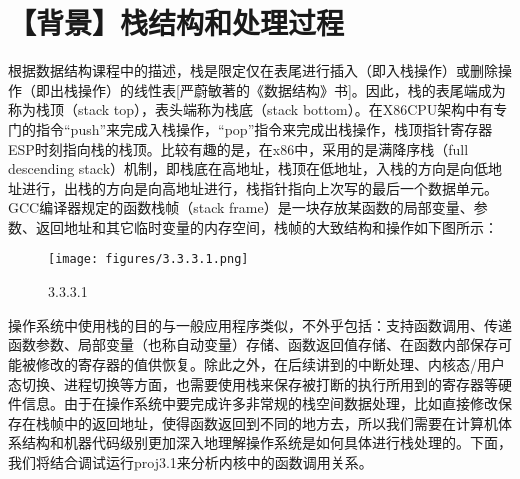 \section{【背景】栈结构和处理过程}\label{ux80ccux666fux6808ux7ed3ux6784ux548cux5904ux7406ux8fc7ux7a0b}

根据数据结构课程中的描述，栈是限定仅在表尾进行插入（即入栈操作）或删除操作（即出栈操作）的线性表{[}严蔚敏著的《数据结构》书{]}。因此，栈的表尾端成为称为栈顶（stack
top），表头端称为栈底（stack
bottom）。在X86CPU架构中有专门的指令``push''来完成入栈操作，``pop''指令来完成出栈操作，栈顶指针寄存器ESP时刻指向栈的栈顶。比较有趣的是，在x86中，采用的是满降序栈（full
descending
stack）机制，即栈底在高地址，栈顶在低地址，入栈的方向是向低地址进行，出栈的方向是向高地址进行，栈指针指向上次写的最后一个数据单元。GCC编译器规定的函数栈帧（stack
frame）是一块存放某函数的局部变量、参数、返回地址和其它临时变量的内存空间，栈帧的大致结构和操作如下图所示：

\begin{figure}[htbp]
\centering
\texttt{[image: figures/3.3.3.1.png]}
\caption{3.3.3.1}
\end{figure}

操作系统中使用栈的目的与一般应用程序类似，不外乎包括：支持函数调用、传递函数参数、局部变量（也称自动变量）存储、函数返回值存储、在函数内部保存可能被修改的寄存器的值供恢复。除此之外，在后续讲到的中断处理、内核态/用户态切换、进程切换等方面，也需要使用栈来保存被打断的执行所用到的寄存器等硬件信息。由于在操作系统中要完成许多非常规的栈空间数据处理，比如直接修改保存在栈帧中的返回地址，使得函数返回到不同的地方去，所以我们需要在计算机体系结构和机器代码级别更加深入地理解操作系统是如何具体进行栈处理的。下面，我们将结合调试运行proj3.1来分析内核中的函数调用关系。
